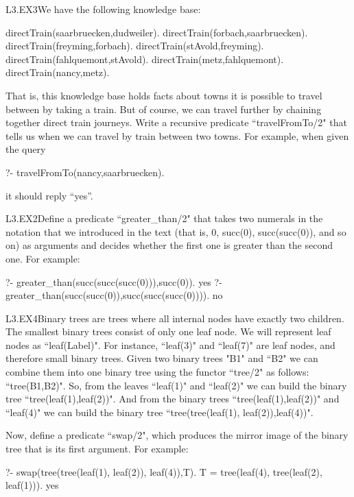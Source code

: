 \begin{LPNexercise}{L3.EX3}We have the following knowledge base:
\begin{LPNcodedisplay}
directTrain(saarbruecken,dudweiler).
directTrain(forbach,saarbruecken).
directTrain(freyming,forbach).
directTrain(stAvold,freyming).
directTrain(fahlquemont,stAvold).
directTrain(metz,fahlquemont).
directTrain(nancy,metz).
\end{LPNcodedisplay}

That is, this knowledge base holds facts about towns it is possible to
travel between by taking a  train.  But of course, we can
travel further by chaining together direct train journeys.  Write a
recursive predicate ``travelFromTo/2" that tells us when we can
travel by train between two towns.  For example, when given the query
\begin{LPNcodedisplay}
?- travelFromTo(nancy,saarbruecken).
\end{LPNcodedisplay}
it should reply ``yes''.
\end{LPNexercise}


\begin{LPNexercise}{L3.EX2}Define a predicate ``greater\_than/2"
that takes two numerals in the notation that we introduced in the text
(that is, 0, succ(0), succ(succ(0)), and so on) as arguments and
decides whether the first one is greater than the second one. For example:
\begin{LPNcodedisplay}
?- greater_than(succ(succ(succ(0))),succ(0)).
yes
?- greater_than(succ(succ(0)),succ(succ(succ(0)))).
no
\end{LPNcodedisplay}
\end{LPNexercise}
\begin{LPNexercise}{L3.EX4}Binary trees
are trees where all internal nodes have exactly two children. The
smallest binary trees consist of only one leaf node. We will represent
leaf nodes as ``leaf(Label)". For instance, ``leaf(3)" and ``leaf(7)" are
leaf nodes, and therefore small binary trees. Given two binary trees
"B1" and ``B2" we can combine them into one binary tree using the
functor ``tree/2" as follows: ``tree(B1,B2)".  So, from the leaves
``leaf(1)" and ``leaf(2)" we can build the binary tree
``tree(leaf(1),leaf(2))". And from the binary trees
``tree(leaf(1),leaf(2))" and ``leaf(4)" we can build the binary tree
``tree(tree(leaf(1), leaf(2)),leaf(4))".


Now, define a predicate ``swap/2", which produces the mirror
image of the binary tree that is its first argument. For example:
\begin{LPNcodedisplay}
?- swap(tree(tree(leaf(1), leaf(2)), leaf(4)),T).
T = tree(leaf(4), tree(leaf(2), leaf(1))).
yes
\end{LPNcodedisplay}
\end{LPNexercise}




